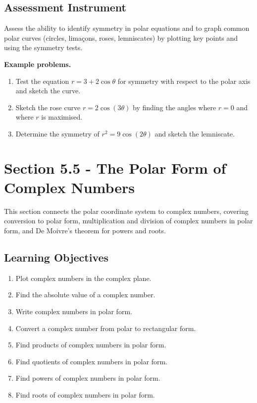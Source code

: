 \subsection{Assessment Instrument}
\label{ssec:asse-3669}

Assess the ability to identify symmetry in polar equations and to graph common polar
curves (circles, limaçons, roses, lemniscates) by plotting key points and using the
symmetry tests.

\textbf{Example problems.}
\begin{enumerate}
    \item Test the equation $r = 3 + 2\cos\theta$ for symmetry with respect to the polar axis and sketch the curve.
    \item Sketch the rose curve $r = 2\cos(3\theta)$ by finding the angles where $r = 0$ and where $r$ is maximised.
    \item Determine the symmetry of $r^{2} = 9\cos(2\theta)$ and sketch the lemniscate.
\end{enumerate}

\section{Section 5.5 - The Polar Form of Complex Numbers}
\label{sec:sect-9c90}

This section connects the polar coordinate system to complex numbers, covering conversion
to polar form, multiplication and division of complex numbers in polar form, and De
Moivre's theorem for powers and roots.

\subsection{Learning Objectives}
\label{ssec:lear-fe6e}

\begin{enumerate}
    \item Plot complex numbers in the complex plane.
    \item Find the absolute value of a complex number.
    \item Write complex numbers in polar form.
    \item Convert a complex number from polar to rectangular form.
    \item Find products of complex numbers in polar form.
    \item Find quotients of complex numbers in polar form.
    \item Find powers of complex numbers in polar form.
    \item Find roots of complex numbers in polar form.
\end{enumerate}

